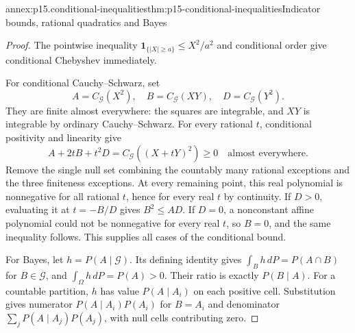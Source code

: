 \begin{annexitem}{annex:p15.conditional-inequalities}{thm:p15-conditional-inequalities}{Indicator bounds, rational quadratics and Bayes}
\begin{proof}
The pointwise inequality
\(\mathbf1_{\{|X|\geq a\}}\leq X^2/a^2\) and conditional
order give conditional Chebyshev immediately.

For conditional Cauchy--Schwarz, set
\[
        A=C_{\mathcal G}(X^2),\quad
        B=C_{\mathcal G}(XY),\quad
        D=C_{\mathcal G}(Y^2).
\]
They are finite almost everywhere: the squares are integrable,
and \(XY\) is integrable by ordinary Cauchy--Schwarz.
For every rational \(t\), conditional positivity and linearity give
\[
                     A+2tB+t^2D=C_{\mathcal G}((X+tY)^2)\geq0
                                      \quad\text{almost everywhere}.
\]
Remove the single null set combining the countably many rational
exceptions and the three finiteness exceptions.
At every remaining point, this real polynomial is nonnegative for
all rational \(t\), hence for every real \(t\) by continuity.
If \(D>0\), evaluating it at \(t=-B/D\) gives \(B^2\leq AD\).
If \(D=0\), a nonconstant affine polynomial could not be nonnegative
for every real \(t\), so \(B=0\), and the same inequality follows.
This supplies all cases of the conditional bound.

For Bayes, let \(h=P(A\mid\mathcal G)\).
Its defining identity gives
\(\int_Bh\,dP=P(A\cap B)\) for \(B\in\mathcal G\), and
\(\int_\Omega h\,dP=P(A)>0\).
Their ratio is exactly \(P(B\mid A)\).
For a countable partition, \(h\) has value \(P(A\mid A_i)\)
on each positive cell. Substitution gives numerator
\(P(A\mid A_i)P(A_i)\) for \(B=A_i\) and denominator
\(\sum_jP(A\mid A_j)P(A_j)\), with null cells contributing zero.
\end{proof}
\end{annexitem}

